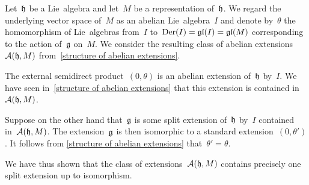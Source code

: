 \begin{remark}
  \label{each class of abelian extensions contains precisely one split extension}
  Let~$\mathfrak{h}$ be a Lie~algebra and let~$M$ be a representation of~$\mathfrak{h}$.
  We regard the underlying vector space of~$M$ as an abelian Lie~algebra~$I$ and denote by~$\theta$ the homomorphism of Lie~algebras from~$I$ to~$\operatorname{Der}(I) = \mathfrak{gl}(I) = \mathfrak{gl}(M)$ corresponding to the action of~$\mathfrak{g}$ on~$M$.
  We consider the resulting class of abelian extensions~$\mathcal{A}(\mathfrak{h}, M)$ from~\cref{structure of abelian extensions}.

  The external semidirect product~$(0,\theta)$ is an abelian extension of~$\mathfrak{h}$ by~$I$.
  We have seen in~\cref{structure of abelian extensions} that this extension is contained in~$\mathcal{A}(\mathfrak{h}, M)$.

  Suppose on the other hand that~$\mathfrak{g}$ is some split extension of~$\mathfrak{h}$ by~$I$ contained in~$\mathcal{A}(\mathfrak{h}, M)$.
  The extension~$\mathfrak{g}$ is then isomorphic to a standard extension~$(0, \theta')$.
  It follows from \cref{structure of abelian extensions} that~$\theta' = \theta$.

  We have thus shown that the class of extensions~$\mathcal{A}(\mathfrak{h}, M)$ contains precisely one split extension up to isomorphism.
\end{remark}


